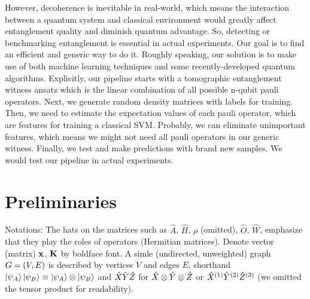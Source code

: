 \documentclass[
aps,
pra,
floatfix,
]{revtex4-2}
\theoremstyle{plain}
\theoremstyle{definition}
\newcommand{\ew}{\hat{W}}
\newcommand{\ob}{\hat{O}}
\newcommand{\hamiltonian}{\hat{H}}
\newcommand{\dm}{\rho}
\begin{document}
However, decoherence is inevitable in real-world, which means the interaction between a quantum system and classical environment would greatly affect entanglement quality and diminish quantum advantage. So, detecting or benchmarking entanglement is essential in actual experiments. Our goal is to find an efficient and generic way to do it. Roughly speaking, our solution is to make use of both machine learning techniques and some recently-developed quantum algorithms.
Explicitly, our pipeline starts with a tomographic entanglement witness ansatz which is the linear combination of all possible n-qubit pauli operators. Next, we generate random density matrices with labels for training. Then, we need to estimate the expectation values of each pauli operator, which are features for training a classical SVM. Probably, we can eliminate unimportant features, which means we might not need all pauli operators in our generic witness. Finally, we test and make predictions with brand new samples. We would test our pipeline in actual experiments. 

\section{Preliminaries}

Notations: 
The hats on the matrices such as $\hat{A}$, $\hamiltonian$, $\dm$ (omitted), $\ob$, $\ew$, emphasize that they play the roles of operators (Hermitian matrices).
Denote vector (matrix) $\vb{x}$, $\vb{K}$ by boldface font.
A simle (undirected, unweighted) graph $G=(V,E)$ is described by vertices $V$ and edges $E$.
shorthand $\ket{\psi_A}\ket{\psi_B}\equiv \ket{\psi_A}\otimes \ket{\psi_B}$ 
and $\hat{X}\hat{Y}\hat{Z}$ for $\hat{X}\otimes \hat{Y} \otimes \hat{Z}$ or $\hat{X}^{(1)}\hat{Y}^{(2)}\hat{Z}^{(3)}$
(we omitted the tensor product for readability).
\end{document}
